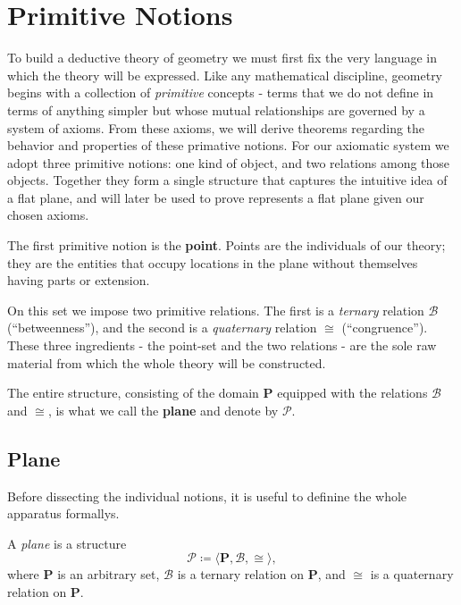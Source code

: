 \documentclass[../../../main/main.tex]{subfiles}
\begin{document}
\chapter{Primitive Notions}

To build a deductive theory of geometry we must first fix the very language in which the theory will be expressed. Like any mathematical discipline, geometry begins with a collection of \textit{primitive} concepts - terms that we do not define in terms of anything simpler but whose mutual relationships are governed by a system of axioms. From these axioms, we will derive theorems regarding the behavior and properties of these primative notions. For our axiomatic system we adopt three primitive notions: one kind of object, and two relations among those objects. Together they form a single structure that captures the intuitive idea of a flat plane, and will later be used to prove represents a flat plane given our chosen axioms.

The first primitive notion is the \textbf{point}. Points are the individuals of our theory; they are the entities that occupy locations in the plane without themselves having parts or extension.

On this set we impose two primitive relations. The first is a \textit{ternary} relation \(\mathcal{B}\) (``betweenness''), and the second is a \textit{quaternary} relation \(\cong\) (``congruence''). These three ingredients - the point-set and the two relations - are the sole raw material from which the whole theory will be constructed.

The entire structure, consisting of the domain \(\mathbf{P}\) equipped with the relations \(\mathcal{B}\) and \(\cong\), is what we call the \textbf{plane} and denote by $\mathcal{P}$.

\section{Plane}

Before dissecting the individual notions, it is useful to definine the whole apparatus formallys.

\begin{definition}[Plane]
A \textit{plane} is a structure
\[
\mathcal{P} \coloneqq \langle \mathbf{P}, \mathcal{B}, \cong \rangle,
\]
where \(\mathbf{P}\) is an arbitrary set, \(\mathcal{B}\) is a ternary relation on \(\mathbf{P}\), and \(\cong\) is a quaternary relation on \(\mathbf{P}\).
\end{definition}
\end{document}
